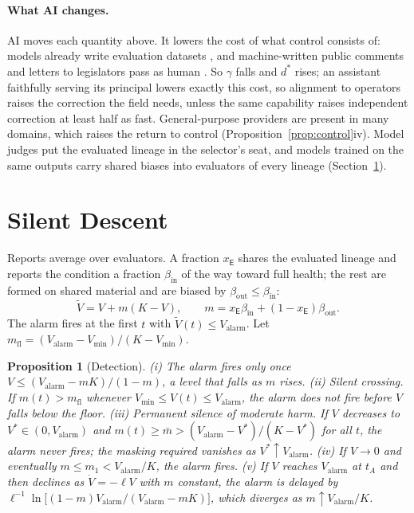 \documentclass[letterpaper]{article} %
\newtheorem{proposition}{Proposition}
\theoremstyle{definition}
\newcommand{\dE}{\mathsf{E}}
\newcommand{\Valarm}{V_{\mathrm{alarm}}}
\newcommand{\Vmin}{V_{\min}}
\newcommand{\mfl}{m_{\mathrm{fl}}}
\begin{document}
\paragraph{What AI changes.} AI moves each quantity above. It lowers the cost of what control consists of: models already write evaluation datasets \citep{perez2023}, and machine-written public comments and letters to legislators pass as human \citep{weiss2019,kreps2024}. So $\gamma$ falls and $d^\ast$ rises; an assistant faithfully serving its principal lowers exactly this cost, so alignment to operators raises the correction the field needs, unless the same capability raises independent correction at least half as fast. General-purpose providers are present in many domains, which raises the return to control (Proposition~\ref{prop:control}iv). Model judges put the evaluated lineage in the selector's seat, and models trained on the same outputs carry shared biases into evaluators of every lineage (Section~\ref{sec:silent}).

\section{Silent Descent}\label{sec:silent}

Reports average over evaluators. A fraction $x_\dE$ shares the evaluated lineage and reports the condition a fraction $\beta_{\mathrm{in}}$ of the way toward full health; the rest are formed on shared material and are biased by $\beta_{\mathrm{out}}\le\beta_{\mathrm{in}}$:
\begin{equation}\label{eq:mask}
\tilde V=V+m(K-V),\qquad m=x_\dE\beta_{\mathrm{in}}+(1-x_\dE)\beta_{\mathrm{out}}.
\end{equation}
The alarm fires at the first $t$ with $\tilde V(t)\le\Valarm$. Let $\mfl=(\Valarm-\Vmin)/(K-\Vmin)$.

\begin{proposition}[Detection]\label{prop:detect}
(i) The alarm fires only once $V\le(\Valarm-mK)/(1-m)$, a level that falls as $m$ rises. (ii) \emph{Silent crossing.} If $m(t)>\mfl$ whenever $\Vmin\le V(t)\le\Valarm$, the alarm does not fire before $V$ falls below the floor. (iii) \emph{Permanent silence of moderate harm.} If $V$ decreases to $V^\ast\in(0,\Valarm)$ and $m(t)\ge\bar m>(\Valarm-V^\ast)/(K-V^\ast)$ for all $t$, the alarm never fires; the masking required vanishes as $V^\ast\uparrow\Valarm$. (iv) If $V\to0$ and eventually $m\le m_1<\Valarm/K$, the alarm fires. (v) If $V$ reaches $\Valarm$ at $t_A$ and then declines as $\dot V=-\ell V$ with $m$ constant, the alarm is delayed by $\ell^{-1}\ln\big[(1-m)\Valarm/(\Valarm-mK)\big]$, which diverges as $m\uparrow\Valarm/K$.
\end{proposition}
\end{document}

